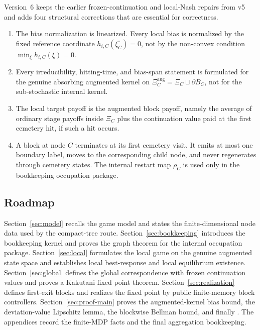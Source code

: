 \documentclass[12pt]{article}
\theoremstyle{definition}
\newcommand{\1}{\mathbf{1}}
\begin{document}
Version~6 keeps the earlier frozen-continuation and local-Nash repairs from v5
and adds four structural corrections that are essential for correctness.

\begin{enumerate}[label=\textnormal{(\arabic*)},leftmargin=2.4em]
\item The bias normalization is linearized. Every local bias is normalized by the
fixed reference coordinate $h_{i,C}(\xi_C^\circ)=0$, not by the non-convex
condition $\min_\xi h_{i,C}(\xi)=0$.
\item Every irreducibility, hitting-time, and bias-span statement is formulated
for the genuine absorbing augmented kernel on
$\Xi_C^{\mathrm{aug}}=\Xi_C\sqcup\partial B_C$, not for the sub-stochastic
internal kernel.
\item The local target payoff is the augmented block payoff, namely the average of
ordinary stage payoffs inside $\Xi_C$ plus the continuation value paid at the
first cemetery hit, if such a hit occurs.
\item A block at node $C$ terminates at its first cemetery visit. It emits at
most one boundary label, moves to the corresponding child node, and never
regenerates through cemetery states. The internal restart map $\rho_C$ is used
only in the bookkeeping occupation package.
\end{enumerate}

\subsection{Roadmap}

Section~\ref{sec:model} recalls the game model and states the finite-dimensional
node data used by the compact-tree route. Section~\ref{sec:bookkeeping}
introduces the bookkeeping kernel and proves the graph theorem for the internal
occupation package. Section~\ref{sec:local} formulates the local game on the
genuine augmented state space and establishes local best-response and local
equilibrium existence. Section~\ref{sec:global} defines the global correspondence
with frozen continuation values and proves a Kakutani fixed point theorem.
Section~\ref{sec:realization} defines first-exit blocks and realizes the fixed
point by public finite-memory block controllers. Section~\ref{sec:proof-main}
proves the augmented-kernel bias bound, the deviation-value Lipschitz lemma, the
blockwise Bellman bound, and finally . The appendices record the
finite-MDP facts and the final aggregation bookkeeping.
\end{document}
